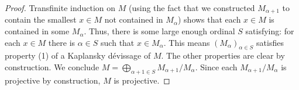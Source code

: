 \begin{proof}
\medskip\noindent
Transfinite induction on $M$ (using the fact that we constructed
$M_{\alpha + 1}$ to contain the smallest $x \in M$ not contained in
$M_{\alpha}$) shows that
each $x \in M$ is contained in some $M_{\alpha}$.  Thus, there is some large
enough ordinal $S$ satisfying: for each $x \in M$ there is $\alpha \in S$ such
that $x \in M_{\alpha}$.  This means $(M_{\alpha})_{\alpha \in S}$ satisfies
property (1) of a Kaplansky d\'evissage of $M$.  The other properties are clear
by construction.  We conclude
$M = \bigoplus_{\alpha + 1 \in S} M_{\alpha + 1}/M_{\alpha}$.
Since each $M_{\alpha + 1}/M_{\alpha}$ is projective
by construction, $M$ is projective.
\end{proof}